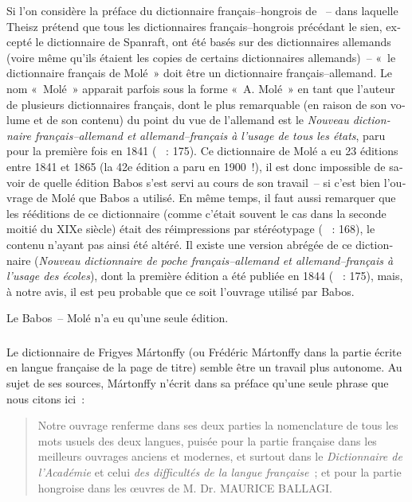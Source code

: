 \documentclass[output=paper,colorlinks,citecolor=brown,arabicfont,chinesefont,booklanguage=french]{langscibook}
\begin{document}
\begin{otherlanguage}{french}
Si l’on considère la préface du dictionnaire français–hongrois de \citet{Theisz1902}~-- dans laquelle Theisz prétend que tous les dictionnaires français–hongrois précédant le sien, excepté le dictionnaire de Spanraft, ont été basés sur des dictionnaires allemands (voire même qu’ils étaient les copies de certains dictionnaires allemands)~-- «~le dictionnaire français de Molé~» doit être un dictionnaire français–allemand. Le nom «~Molé~» apparait parfois sous la forme «~A. Molé~» en tant que l’auteur de plusieurs dictionnaires français, dont le plus remarquable (en raison de son volume et de son contenu) du point du vue de l’allemand est le \emph{Nouveau dictionnaire français–allemand et allemand–français à l’usage de tous les états}, paru pour la première fois en 1841 (\citealt{Bray2000} ~: 175). Ce dictionnaire de Molé a eu 23 éditions entre 1841 et 1865 (la 42e édition a paru en 1900~!), il est donc impossible de savoir de quelle édition Babos s’est servi au cours de son travail~-- si c’est bien l’ouvrage de Molé que Babos a utilisé. En même temps, il faut aussi remarquer que les rééditions de ce dictionnaire (comme c’était souvent le cas dans la seconde moitié du XIXe siècle) était des réimpressions par stéréotypage (\citealt{Bray2000} ~: 168), le contenu n’ayant pas ainsi été altéré. Il existe une version abrégée de ce dictionnaire (\emph{Nouveau dictionnaire de poche français–allemand et allemand–français à l’usage des écoles}), dont la première édition a été publiée en 1844 (\citealt{Bray2000} ~: 175), mais, à notre avis, il est peu probable que ce soit l’ouvrage utilisé par Babos.

Le Babos~-- Molé n’a eu qu’une seule édition.

\subsubsection{\citealt{Martonffy1879}}\label{sec:tillinger:2.1.2}

Le dictionnaire de Frigyes Mártonffy (ou Frédéric Mártonffy dans la partie écrite en langue française de la page de titre) semble être un travail plus autonome. Au sujet de ses sources, Mártonffy n’écrit dans sa préface qu’une seule phrase que nous citons ici~:

\begin{quote}
    Notre ouvrage renferme dans ses deux parties la nomenclature de tous les mots usuels des deux langues, puisée pour la partie française dans les meilleurs ouvrages anciens et modernes, et surtout dans le \emph{Dictionnaire de l’Académie} et celui \emph{des difficultés de la langue française}~; et pour la partie hongroise dans les œuvres de M. Dr. MAURICE BALLAGI.
\end{quote}


\end{otherlanguage}
\end{document}
